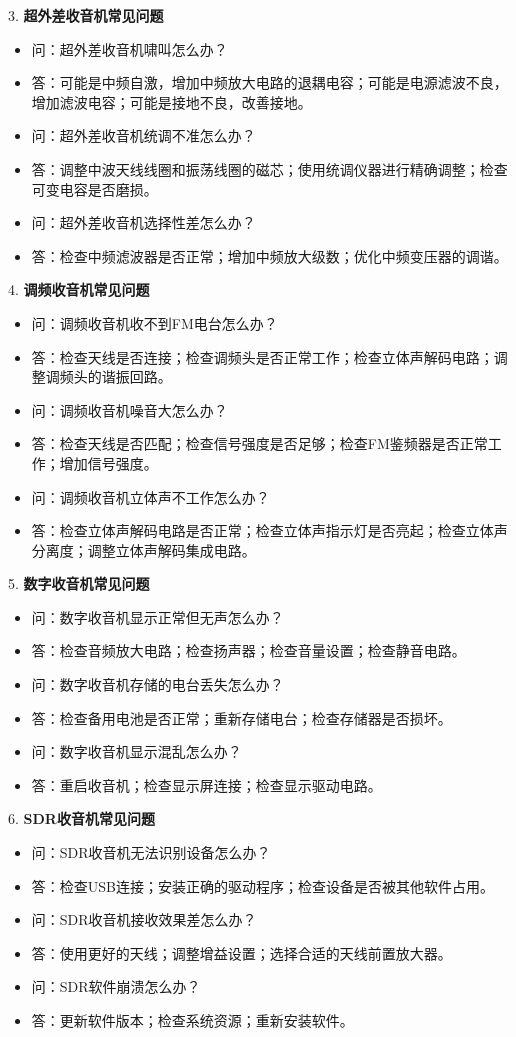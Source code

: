 \documentclass[12pt,UTF8]{ctexbook}
\begin{document}
3. \textbf{超外差收音机常见问题}
   \begin{itemize}[leftmargin=3.5em]
   \item 问：超外差收音机啸叫怎么办？
   \item 答：可能是中频自激，增加中频放大电路的退耦电容；可能是电源滤波不良，增加滤波电容；可能是接地不良，改善接地。
   \item 问：超外差收音机统调不准怎么办？
   \item 答：调整中波天线线圈和振荡线圈的磁芯；使用统调仪器进行精确调整；检查可变电容是否磨损。
   \item 问：超外差收音机选择性差怎么办？
   \item 答：检查中频滤波器是否正常；增加中频放大级数；优化中频变压器的调谐。
   \end{itemize}

4. \textbf{调频收音机常见问题}
   \begin{itemize}[leftmargin=3.5em]
   \item 问：调频收音机收不到FM电台怎么办？
   \item 答：检查天线是否连接；检查调频头是否正常工作；检查立体声解码电路；调整调频头的谐振回路。
   \item 问：调频收音机噪音大怎么办？
   \item 答：检查天线是否匹配；检查信号强度是否足够；检查FM鉴频器是否正常工作；增加信号强度。
   \item 问：调频收音机立体声不工作怎么办？
   \item 答：检查立体声解码电路是否正常；检查立体声指示灯是否亮起；检查立体声分离度；调整立体声解码集成电路。
   \end{itemize}

5. \textbf{数字收音机常见问题}
   \begin{itemize}[leftmargin=3.5em]
   \item 问：数字收音机显示正常但无声怎么办？
   \item 答：检查音频放大电路；检查扬声器；检查音量设置；检查静音电路。
   \item 问：数字收音机存储的电台丢失怎么办？
   \item 答：检查备用电池是否正常；重新存储电台；检查存储器是否损坏。
   \item 问：数字收音机显示混乱怎么办？
   \item 答：重启收音机；检查显示屏连接；检查显示驱动电路。
   \end{itemize}

6. \textbf{SDR收音机常见问题}
   \begin{itemize}[leftmargin=3.5em]
   \item 问：SDR收音机无法识别设备怎么办？
   \item 答：检查USB连接；安装正确的驱动程序；检查设备是否被其他软件占用。
   \item 问：SDR收音机接收效果差怎么办？
   \item 答：使用更好的天线；调整增益设置；选择合适的天线前置放大器。
   \item 问：SDR软件崩溃怎么办？
   \item 答：更新软件版本；检查系统资源；重新安装软件。
   \end{itemize}
\end{document}
